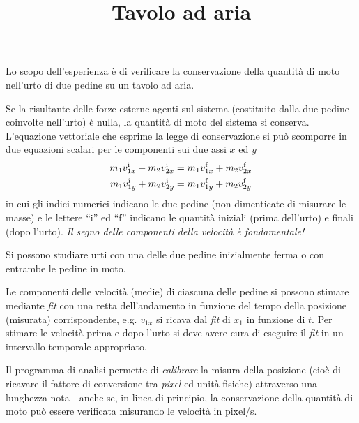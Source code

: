 \documentclass{lab1-article}
\title{Tavolo ad aria}
\begin{document}
\begin{article}

\maketitle

\secsummary

Lo scopo dell'esperienza \`e di verificare la conservazione della quantit\`a
di moto nell'urto di due pedine su un tavolo ad aria.


\secmeasurements

Se la risultante delle forze esterne agenti sul sistema (costituito dalla due
pedine coinvolte nell'urto) \`e nulla, la quantit\`a di moto del sistema si
conserva. 
L'equazione vettoriale che esprime la legge di conservazione si pu\`o scomporre
in due equazioni scalari per le componenti sui due assi $x$ ed $y$
\begin{align}
  m_1 v^{\rm i}_{1x} + m_2 v^{\rm i}_{2x} &=
  m_1 v^{\rm f}_{1x} + m_2 v^{\rm f}_{2x} \nonumber\\
  m_1 v^{\rm i}_{1y} + m_2 v^{\rm i}_{2y} &= m_1 v^{\rm f}_{1y} + m_2 v^{\rm f}_{2y}
\end{align}
in cui gli indici numerici indicano le due pedine (non dimenticate di misurare
le masse) e le lettere ``i'' ed ``f'' indicano le quantit\`a iniziali (prima
dell'urto) e finali (dopo l'urto).
\emph{Il segno delle componenti della velocit\`a \`e fondamentale!}

Si possono studiare urti con una delle due pedine inizialmente ferma o con
entrambe le pedine in moto.



Le componenti delle velocit\`a (medie) di ciascuna delle pedine si possono
stimare mediante \emph{fit} con una retta dell'andamento in funzione
del tempo della posizione (misurata) corrispondente, e.g. $v_{1x}$ si ricava dal
\emph{fit} di $x_1$ in funzione di $t$. Per stimare le velocit\`a prima e dopo
l'urto si deve avere cura di eseguire il \emph{fit} in un intervallo temporale
appropriato.

Il programma di analisi permette di \emph{calibrare} la misura della posizione
(cio\`e di ricavare il fattore di conversione tra \emph{pixel} ed unit\`a
fisiche) attraverso una lunghezza nota---anche se, in linea di principio, la
conservazione della quantit\`a di moto pu\`o essere verificata misurando le
velocit\`a in pixel/s.


\secconsiderations


\end{article}
\end{document}
